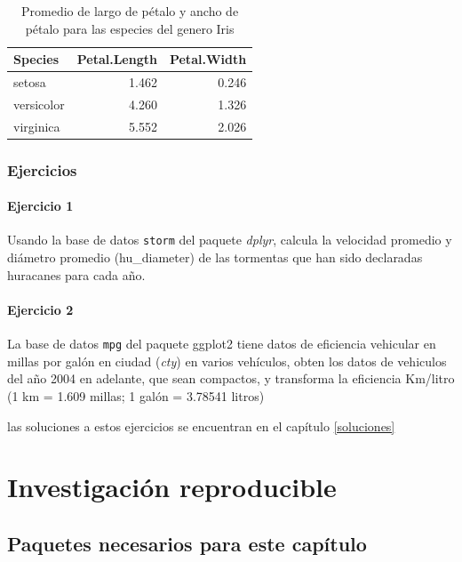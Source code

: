 \documentclass[]{book}
\begin{document}
\begin{table}

\caption{\label{tab:Selected}Promedio de largo de pétalo y ancho de pétalo para las especies del genero Iris}
\centering
\begin{tabular}[t]{lrr}
\toprule
Species & Petal.Length & Petal.Width\\
\midrule
setosa & 1.462 & 0.246\\
versicolor & 4.260 & 1.326\\
virginica & 5.552 & 2.026\\
\bottomrule
\end{tabular}
\end{table}

\hypertarget{ejercicios}{%
\subsection{Ejercicios}\label{ejercicios}}

\hypertarget{ejercicio-1}{%
\subsubsection{Ejercicio 1}\label{ejercicio-1}}

Usando la base de datos \texttt{storm} del paquete \emph{dplyr}, calcula
la velocidad promedio y diámetro promedio (hu\_diameter) de las
tormentas que han sido declaradas huracanes para cada año.

\hypertarget{ejercicio-2}{%
\subsubsection{Ejercicio 2}\label{ejercicio-2}}

La base de datos \texttt{mpg} del paquete ggplot2 tiene datos de
eficiencia vehicular en millas por galón en ciudad (\emph{cty}) en
varios vehículos, obten los datos de vehiculos del año 2004 en adelante,
que sean compactos, y transforma la eficiencia Km/litro (1 km = 1.609
millas; 1 galón = 3.78541 litros)

las soluciones a estos ejercicios se encuentran en el capítulo
\ref{soluciones}

\hypertarget{reproducible}{%
\chapter{Investigación reproducible}\label{reproducible}}

\hypertarget{paquetes-necesarios-para-este-capitulo-1}{%
\section{Paquetes necesarios para este
capítulo}\label{paquetes-necesarios-para-este-capitulo-1}}
\end{document}
